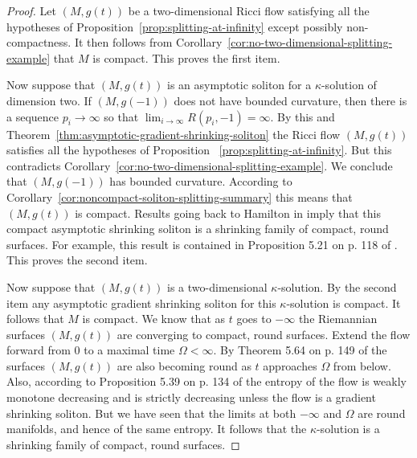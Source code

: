 \begin{proof}
Let $(M,g(t))$ be a two-dimensional Ricci flow satisfying all the hypotheses of
Proposition~\ref{prop:splitting-at-infinity} except possibly non-compactness. It then follows
from Corollary~\ref{cor:no-two-dimensional-splitting-example} that $M$ is compact. This proves the first item.


Now suppose that $(M,g(t))$ is an asymptotic soliton for a
$\kappa$-solution of dimension two. If $(M,g(-1))$ does not have
bounded curvature, then there is a sequence $p_i\rightarrow \infty$
so that $\lim_{i\rightarrow \infty}R(p_i,-1)=\infty$. By this
and
 Theorem~\ref{thm:asymptotic-gradient-shrinking-soliton} the Ricci flow $(M,g(t))$ satisfies all the hypotheses
 of Proposition ~\ref{prop:splitting-at-infinity}. But this contradicts Corollary~\ref{cor:no-two-dimensional-splitting-example}.
 We conclude that $(M,g(-1))$ has bounded curvature. According to
 Corollary~\ref{cor:noncompact-soliton-splitting-summary} this means that
 $(M,g(t))$ is compact.
Results going back to Hamilton in \cite{Hamiltonsurface} imply that
this compact asymptotic shrinking soliton is a shrinking family of
compact, round surfaces. For example, this result is contained in
Proposition 5.21 on p. 118 of \cite{ChowKnopf}.
  This proves the second item.


 Now suppose that $(M,g(t))$ is a two-dimensional $\kappa$-solution.
 By the second item any asymptotic gradient shrinking soliton for
 this $\kappa$-solution is compact.
It follows that $M$ is compact. We know that as $t$ goes to $-\infty$ the
Riemannian surfaces $(M,g(t))$ are converging to compact, round surfaces.
Extend the flow forward from $0$ to a maximal time $\Omega<\infty$. By Theorem
5.64 on p. 149 of \cite{ChowKnopf} the surfaces $(M,g(t))$ are also becoming
round as $t$ approaches $\Omega$ from below. Also, according to Proposition
5.39 on p. 134 of \cite{ChowKnopf} the entropy of the flow is weakly monotone
decreasing and is strictly decreasing unless the flow is a gradient shrinking
soliton. But we have seen that the limits at both $-\infty$ and $\Omega$ are
round manifolds, and hence of the same entropy. It follows that the
$\kappa$-solution is a shrinking family of compact, round surfaces.
\end{proof}



